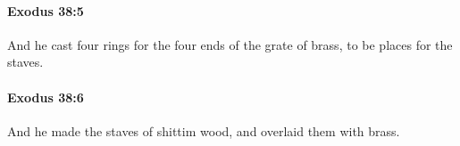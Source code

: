 		\paragraph{Exodus 38:5} %
			\label{EXODUS-38-5}

			And he cast four rings for the four ends of the grate of brass, to be places for the staves.


		\paragraph{Exodus 38:6} %
			\label{EXODUS-38-6}

			And he made the staves of shittim wood, and overlaid them with brass.


